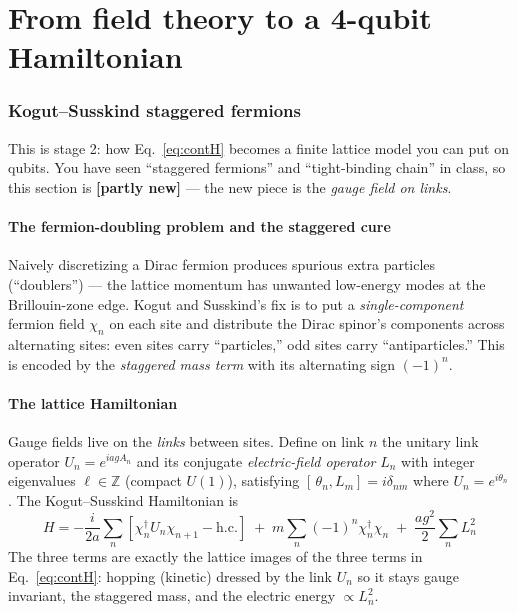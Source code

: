 \documentclass[11pt,a4paper]{article}
\newcommand{\partly}{\textcolor{orange!85!black}{\textbf{[partly new]}}}
\begin{document}
\part{From field theory to a 4-qubit Hamiltonian}

\section{Kogut--Susskind staggered fermions}\label{sec:ks}

\begin{whybox}
This is stage 2: how Eq.~\eqref{eq:contH} becomes a finite lattice model you can put on qubits. You
have seen ``staggered fermions'' and ``tight-binding chain'' in class, so this section is
\partly{} --- the new piece is the \emph{gauge field on links}.
\end{whybox}

\subsection{The fermion-doubling problem and the staggered cure}
Naively discretizing a Dirac fermion produces spurious extra particles (``doublers'') --- the
lattice momentum has unwanted low-energy modes at the Brillouin-zone edge. Kogut and Susskind's fix
is to put a \emph{single-component} fermion field $\chi_n$ on each site and distribute the Dirac
spinor's components across alternating sites: even sites carry ``particles,'' odd sites carry
``antiparticles.'' This is encoded by the \emph{staggered mass term} with its alternating sign
$(-1)^n$.

\subsection{The lattice Hamiltonian}
Gauge fields live on the \emph{links} between sites. Define on link $n$ the unitary link operator
$U_n=e^{iag A_n}$ and its conjugate \emph{electric-field operator} $L_n$ with integer eigenvalues
$\ell\in\mathbb{Z}$ (compact $U(1)$), satisfying $[\,\theta_n, L_m]=i\delta_{nm}$ where
$U_n=e^{i\theta_n}$. The Kogut--Susskind Hamiltonian is
\begin{equation}
\boxed{\;
H = -\frac{i}{2a}\sum_{n}\left[\chi^\dagger_n U_n \chi_{n+1} - \text{h.c.}\right]
\;+\; m\sum_n (-1)^n \chi^\dagger_n\chi_n
\;+\; \frac{a g^2}{2}\sum_n L_n^2 \; }
\label{eq:ksH}
\end{equation}
The three terms are exactly the lattice images of the three terms in Eq.~\eqref{eq:contH}: hopping
(kinetic) dressed by the link $U_n$ so it stays gauge invariant, the staggered mass, and the
electric energy $\propto L_n^2$.
\end{document}
